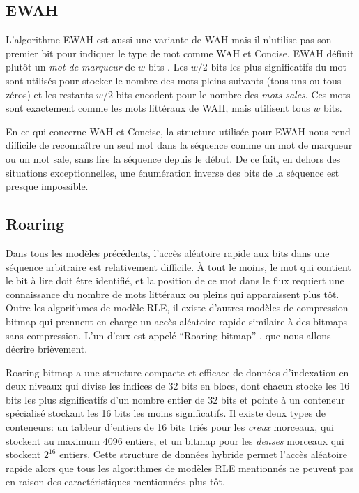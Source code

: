 \subsection{EWAH}

L'algorithme EWAH \citep{lemire2010} est aussi une variante de WAH mais il n'utilise pas son premier bit pour indiquer le type de mot comme WAH et Concise. EWAH définit plutôt un \emph{mot de marqueur} de $w$ bits . Les $w/2$ bits les plus significatifs du mot sont utilisés pour stocker le nombre des mots pleins suivants (tous uns ou tous zéros) et les restants $w/2$ bits encodent pour le nombre des \emph{mots sales}. Ces mots sont exactement comme les mots littéraux de WAH, mais utilisent tous $w$ bits.

En ce qui concerne WAH et Concise, la structure utilisée pour EWAH nous rend difficile de reconnaître un seul mot dans la séquence comme un mot de marqueur ou un mot sale, sans lire la séquence depuis le début. De ce fait, en dehors des situations exceptionnelles, une énumération inverse des bits de la séquence est presque impossible.

\subsection{Roaring}

Dans tous les modèles précédents, l'accès aléatoire rapide aux bits dans une séquence arbitraire est relativement difficile. À tout le moins, le mot qui contient le bit à lire doit être identifié, et la position de ce mot dans le flux requiert une connaissance du nombre de mots littéraux ou pleins qui apparaissent plus tôt. Outre les algorithmes de modèle RLE, il existe d'autres modèles de compression bitmap qui prennent en charge un accès aléatoire rapide similaire à des bitmaps sans compression. L'un d'eux est appelé ``Roaring bitmap'' \citep{lemire2015}, que nous allons décrire brièvement.

Roaring bitmap a une structure compacte et efficace de données d'indexation en deux niveaux qui divise les indices de 32 bits en blocs, dont chacun stocke les 16 bits les plus significatifs d'un nombre entier de 32 bits et pointe à un conteneur spécialisé stockant les 16 bits les moins significatifs. Il existe deux types de conteneurs: un tableur d'entiers de 16 bits triés pour les \emph{creux} morceaux, qui stockent au maximum 4096 entiers, et un bitmap pour les \emph{denses} morceaux qui stockent $2^{16}$ entiers. Cette structure de données hybride permet l'accès aléatoire rapide alors que tous les algorithmes de modèles RLE mentionnés ne peuvent pas en raison des caractéristiques mentionnées plus tôt.

